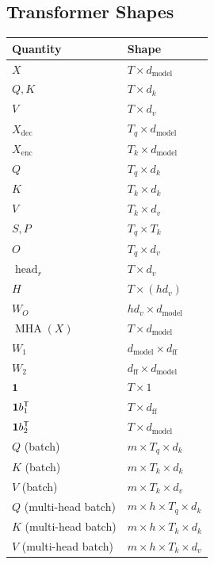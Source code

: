 \subsection{Transformer Shapes}

\begin{center}
\begin{tabular}{ll}
\toprule
Quantity & Shape \\
\midrule
$X$ & $T \times d_{\mathrm{model}}$ \\
$Q,K$ & $T \times d_k$ \\
$V$ & $T \times d_v$ \\
$X_{\mathrm{dec}}$ & $T_q \times d_{\mathrm{model}}$ \\
$X_{\mathrm{enc}}$ & $T_k \times d_{\mathrm{model}}$ \\
$Q$ & $T_q \times d_k$ \\
$K$ & $T_k \times d_k$ \\
$V$ & $T_k \times d_v$ \\
$S,P$ & $T_q \times T_k$ \\
$O$ & $T_q \times d_v$ \\
$\operatorname{head}_r$ & $T \times d_v$ \\
$H$ & $T \times (h d_v)$ \\
$W_O$ & $h d_v \times d_{\mathrm{model}}$ \\
$\operatorname{MHA}(X)$ & $T \times d_{\mathrm{model}}$ \\
$W_1$ & $d_{\mathrm{model}} \times d_{\mathrm{ff}}$ \\
$W_2$ & $d_{\mathrm{ff}} \times d_{\mathrm{model}}$ \\
$\mathbf{1}$ & $T \times 1$ \\
$\mathbf{1}b_1^{\mathsf{T}}$ & $T \times d_{\mathrm{ff}}$ \\
$\mathbf{1}b_2^{\mathsf{T}}$ & $T \times d_{\mathrm{model}}$ \\
$Q$ (batch) & $m \times T_q \times d_k$ \\
$K$ (batch) & $m \times T_k \times d_k$ \\
$V$ (batch) & $m \times T_k \times d_v$ \\
$Q$ (multi-head batch) & $m \times h \times T_q \times d_k$ \\
$K$ (multi-head batch) & $m \times h \times T_k \times d_k$ \\
$V$ (multi-head batch) & $m \times h \times T_k \times d_v$ \\
\bottomrule
\end{tabular}
\end{center}

